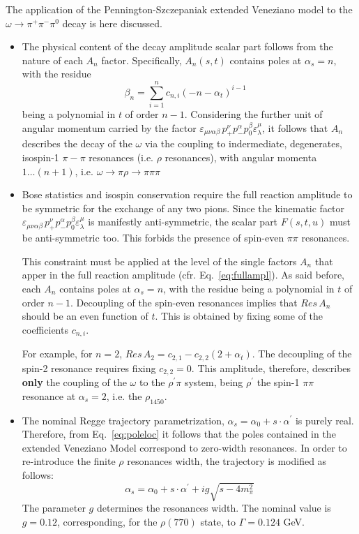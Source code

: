\documentclass[a4paper,10pt]{report}
\newcommand{\decay}{$\omega \rightarrow \pi^+ \pi^- \pi^0$ }
\begin{document}
The application of the Pennington-Szczepaniak extended Veneziano model to the \decay decay is here discussed.
\begin{itemize}
\item The physical content of the decay amplitude scalar part follows from the nature of each $A_n$ factor. Specifically, $A_n(s,t)$ 
contains poles at $\alpha_s=n$, with the residue
 $$\beta_n=\sum^n_{i=1} c_{n,i} (-n-\alpha_t)^{i-1} \; \; \;$$
being a polynomial in $t$ of order $n-1$.
Considering the further unit of angular momentum carried by the factor $\varepsilon_{\mu \nu \alpha \beta}\, p^{\nu}_{+}p^{\alpha}_{-}p^{\beta}_{0}\varepsilon^{\mu}_{\lambda}$,
it follows that $A_n$ describes the decay of the $\omega$ via the coupling to indermediate, degenerates, isospin-1 $\pi-\pi$ resonances (i.e. $\rho$ resonances),
with angular momenta $1\ldots (n+1)$, i.e. $\omega \rightarrow \pi \rho \rightarrow \pi\pi\pi$


 
\item Bose statistics and isospin conservation require the full reaction amplitude to be symmetric for the exchange of any two pions. Since the kinematic factor
 $\varepsilon_{\mu \nu \alpha \beta}\, p^{\nu}_{+}p^{\alpha}_{-}p^{\beta}_{0}\varepsilon^{\mu}_{\lambda}$ is manifestly anti-symmetric, the scalar part $F(s,t,u)$ must be anti-symmetric too.
This forbids the presence of spin-even $\pi \pi$ resonances.

This constraint must be applied at the level of the single factors $A_n$ that apper in the full reaction amplitude (cfr. Eq.~\ref{eq:fullampl}). 
As said before, each $A_n$ contains poles at $\alpha_s=n$, with the residue being a polynomial in $t$ of order $n-1$.
Decoupling of the spin-even resonances implies that $Res \, A_{n}$ should be an even function of $t$. This is obtained by fixing some of the coefficients $c_{n,i}$.

For example, for $n=2$, $Res \, A_{2}=c_{2,1}-c_{2,2}(2+\alpha_t)$. The decoupling of the spin-2 resonance requires fixing $c_{2,2}=0$. This amplitude, therefore,
describes \textbf{only} the coupling of the $\omega$ to the $\rho^\prime \pi$ system, being $\rho^\prime$ the spin-1 $\pi \pi$ resonance at $\alpha_s=2$, i.e. the $\rho_{1450}$.

\item The nominal Regge trajectory parametrization, $\alpha_s=\alpha_0+s\cdot\alpha^{\prime}$ is purely real. Therefore, from Eq.~\ref{eq:poleloc} it follows that the poles contained in the extended Veneziano Model correspond to zero-width resonances. In order to re-introduce the finite $\rho$ resonances width, the trajectory is modified as follows:
\begin{equation}\label{eq:reggenominal}
\alpha_s=\alpha_0 + s \cdot \alpha^\prime + i g \sqrt{s-4m^2_\pi}
\end{equation}
The parameter $g$ determines the resonances width. The nominal value is $g=0.12$, corresponding, for the $\rho(770)$ state, to $\Gamma=0.124$ GeV.
\end{itemize}
\end{document}
